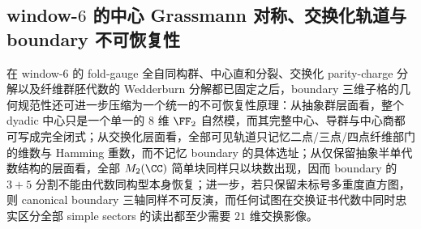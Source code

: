 \subsection{window-\texorpdfstring{$6$}{6} 的中心 Grassmann 对称、交换化轨道与 boundary 不可恢复性}\label{subsec:conclusion-window6-center-grassmann-abelian-boundary-nonrecoverability}
在 window-\(6\) 的 fold-gauge 全自同构群、中心直和分裂、交换化 parity-charge 分解以及纤维群胚代数的 Wedderburn 分解都已固定之后，boundary 三维子格的几何规范性还可进一步压缩为一个统一的不可恢复性原理：从抽象群层面看，整个 dyadic 中心只是一个单一的 \(8\) 维 \(\FF_2\) 自然模，而其完整中心、导群与中心商都可写成完全闭式；从交换化层面看，全部可见轨道只记忆二点/三点/四点纤维部门的维数与 Hamming 重数，而不记忆 boundary 的具体选址；从仅保留抽象半单代数结构的层面看，全部 \(M_2(\CC)\) 简单块同样只以块数出现，因而 boundary 的 \(3+5\) 分割不能由代数同构型本身恢复；进一步，若只保留未标号多重度直方图，则 canonical boundary 三轴同样不可反演，而任何试图在交换证书代数中同时忠实区分全部 simple sectors 的读出都至少需要 \(21\) 维交换影像。

